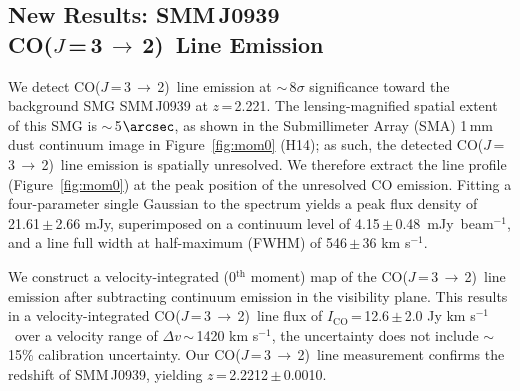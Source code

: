 \documentclass[twocolumn,apj,numberedappendix]{emulateapj}
\newcommand{\CO}{\mbox{CO($J$\,=\,3\,$\rightarrow$\,2) }}
\newcommand{\pmOne}{\mbox{$^{-1}$}}
\begin{document}
\subsection{New Results: SMM\,J0939\\ \CO Line Emission}
We detect \CO line emission at $\sim$\,8$\sigma$ significance toward the background SMG SMM\,J0939 at $z$\,=\,2.221.
The lensing-magnified spatial extent of this SMG is $\sim$\,5$\arcsec$, as shown in the Submillimeter Array (SMA) 1\,mm dust continuum image in Figure~\ref{fig:mom0} (H14); as such,
the detected \CO line emission is spatially unresolved. We therefore extract the line profile (Figure~\ref{fig:mom0}) at the peak position of the unresolved
CO emission. Fitting a four-parameter single Gaussian to the spectrum yields a peak flux density of 21.61\,$\pm$\,2.66\,\,mJy, superimposed on a
continuum level of 4.15\,$\pm$\,0.48~mJy~beam\pmOne, and a line full width at half-maximum (FWHM) of 546\,$\pm$\,36\,\,km\,\,s\pmOne.  \par
We construct a velocity-integrated (0$^\textrm{th}$ moment) map of the \CO line
emission after subtracting continuum emission in the visibility plane. This results in a velocity-integrated \CO line flux of $I_\textrm{CO}$\,=\,12.6\,$\pm$\,2.0 Jy km\,\,s\pmOne\ over a velocity range of $\Delta v$\,$\sim$\,1420 km\,\,s\pmOne, the uncertainty does not include $\sim$\,15\% calibration
uncertainty. Our \CO line measurement confirms the redshift of SMM\,J0939, yielding $z$\,=\,2.2212\,$\pm$\,0.0010.
\end{document}

